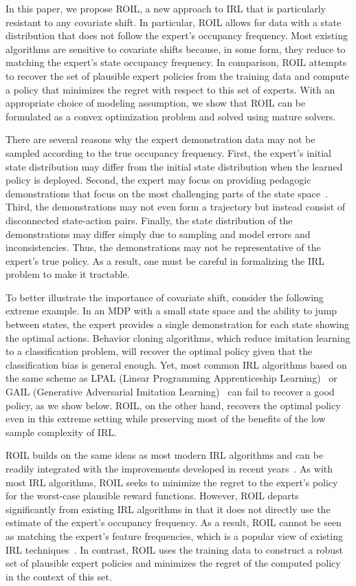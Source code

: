 \documentclass[10pt]{article}
\renewcommand{\cite}{\citep}
\theoremstyle{plain}
\theoremstyle{remark}
\begin{document}
In this paper, we propose ROIL, a new approach to IRL that is particularly resistant to any covariate shift. In particular, ROIL allows for data with a state distribution that does not follow the expert's occupancy frequency. Most existing algorithms are sensitive to covariate shifts because, in some form, they reduce to matching the expert's state occupancy frequency. In comparison, ROIL attempts to recover the set of plausible expert policies from the training data and compute a policy that minimizes the regret with respect to this set of experts. With an appropriate choice of modeling assumption, we show that ROIL can be formulated as a convex optimization problem and solved using mature solvers.

There are several reasons why the expert demonstration data may not be sampled according to the true occupancy frequency. First, the expert's initial state distribution may differ from the initial state distribution when the learned policy is deployed. Second, the expert may focus on providing pedagogic demonstrations that focus on the most challenging parts of the state space~\cite{cakmak2012algorithmic,hadfield2016cooperative,Brown2018b}. Third, the demonstrations may not even form a trajectory but instead consist of disconnected state-action pairs. Finally, the state distribution of the demonstrations may differ simply due to sampling and model errors and inconsistencies. Thus, the demonstrations may not be representative of the expert's true policy. As a result, one must be careful in formalizing the IRL problem to make it tractable.

To better illustrate the importance of covariate shift, consider the following extreme example. In an MDP with a small state space and the ability to jump between states, the expert provides a single demonstration for each state showing the optimal actions. Behavior cloning algorithms, which reduce imitation learning to a classification problem, will recover the optimal policy given that the classification bias is general enough. Yet, most common IRL algorithms based on the same scheme as LPAL (Linear Programming Apprenticeship Learning)~\cite{Syed2008} or GAIL (Generative Adversarial Imitation Learning)~\cite{Ho2016} can fail to recover a good policy, as we show below. ROIL, on the other hand, recovers the optimal policy even in this extreme setting while preserving most of the benefits of the low sample complexity of IRL.

ROIL builds on the same ideas as most modern IRL algorithms and can be readily integrated with the improvements developed in recent years~\cite{arora2021survey}. As with most IRL algorithms, ROIL seeks to minimize the regret to the expert's policy for the worst-case plausible reward functions. However, ROIL departs significantly from existing IRL algorithms in that it does not directly use the estimate of the expert's occupancy frequency. As a result, ROIL cannot be seen as matching the expert's feature frequencies, which is a popular view of existing IRL techniques~\cite{abbeel2004,Syed2008,Ho2016}. In contrast, ROIL uses the training data to construct a robust set of plausible expert policies and minimizes the regret of the computed policy in the context of this set. 
\end{document}
